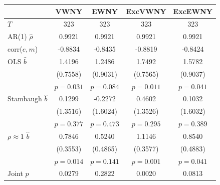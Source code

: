 \begin{tabular}{lcccc}
\toprule
 & VWNY & EWNY & ExcVWNY & ExcEWNY \\
\midrule
$T$ & 323 & 323 & 323 & 323 \\
AR(1) $\hat\rho$ & 0.9921 & 0.9921 & 0.9921 & 0.9921 \\
corr($e,m$) & -0.8834 & -0.8435 & -0.8819 & -0.8424 \\
\midrule
OLS $\hat b$ & 1.4196 & 1.2486 & 1.7492 & 1.5782 \\
 & (0.7558) & (0.9031) & (0.7565) & (0.9037) \\
 & $p=0.031$ & $p=0.084$ & $p=0.011$ & $p=0.041$ \\
Stambaugh $\hat b$ & 0.1299 & -0.2272 & 0.4602 & 0.1032 \\
 & (1.3516) & (1.6024) & (1.3526) & (1.6032) \\
 & $p=0.377$ & $p=0.473$ & $p=0.295$ & $p=0.389$ \\
$\rho\approx1$ $\hat b$ & 0.7846 & 0.5240 & 1.1146 & 0.8540 \\
 & (0.3553) & (0.4865) & (0.3577) & (0.4883) \\
 & $p=0.014$ & $p=0.141$ & $p=0.001$ & $p=0.041$ \\
\midrule
Joint $p$ & 0.0279 & 0.2822 & 0.0020 & 0.0813 \\
\bottomrule
\end{tabular}
